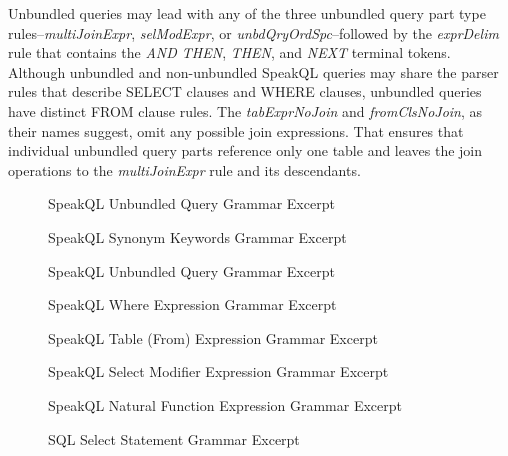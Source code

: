 Unbundled queries may lead with any of the three unbundled query part type rules--\emph{multiJoinExpr}, \emph{selModExpr}, or \emph{unbdQryOrdSpc}--followed by the \emph{exprDelim} rule that contains the \emph{AND THEN}, \emph{THEN}, and \emph{NEXT} terminal tokens. 
Although unbundled and non-unbundled SpeakQL queries may share the parser rules that describe SELECT clauses and WHERE clauses, unbundled queries have distinct FROM clause rules. 
The \emph{tabExprNoJoin} and \emph{fromClsNoJoin}, as their names suggest, omit any possible join expressions. That ensures that individual unbundled query parts reference only one table and leaves the join operations to the \emph{multiJoinExpr} rule and its descendants.

\begin{figure}
  \unbundleQueryTable
  \caption{SpeakQL Unbundled Query Grammar Excerpt}
  \label{fig:unbundlegrammar}
\end{figure}

\begin{figure}
\synonymgrammartable
\caption{SpeakQL Synonym Keywords Grammar Excerpt}
\label{fig:synonymgrammar}
\end{figure}

\begin{figure}
\unbundleQueryTable
\caption{SpeakQL Unbundled Query Grammar Excerpt}
\end{figure}

\begin{figure}
\whereExpressionTable
\caption{SpeakQL Where Expression Grammar Excerpt}
\label{fig:wheregrammar}
\end{figure}

\begin{figure}
\tableExpressionTable
\caption{SpeakQL Table (From) Expression Grammar Excerpt}
\label{fig:tablegrammar}
\end{figure}

\begin{figure}
\selectModifierTable
\caption{SpeakQL Select Modifier Expression Grammar Excerpt}
\label{fig:modifiergrammar}
\end{figure}

\begin{figure}
\naturalFunctionTable
\caption{SpeakQL Natural Function Expression Grammar Excerpt}
\label{fig:naturalfunctiongrammar}
\end{figure}

\begin{figure}
\sqlSelectStatementTable
\caption{SQL Select Statement Grammar Excerpt}
\label{fig:sqlselectgrammar}
\end{figure}

